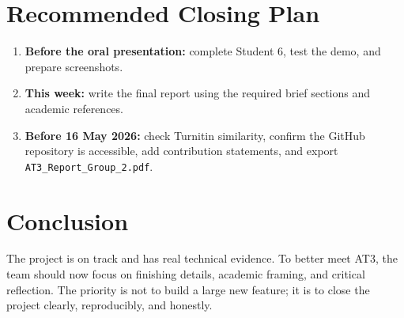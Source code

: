 \documentclass[11pt,a4paper]{article}
\begin{document}
\section{Recommended Closing Plan}
\begin{enumerate}
  \item \textbf{Before the oral presentation:} complete Student 6, test the demo, and prepare screenshots.
  \item \textbf{This week:} write the final report using the required brief sections and academic references.
  \item \textbf{Before 16 May 2026:} check Turnitin similarity, confirm the GitHub repository is accessible, add contribution statements, and export \texttt{AT3\_Report\_Group\_2.pdf}.
\end{enumerate}

\section{Conclusion}
The project is on track and has real technical evidence. To better meet AT3, the team should now focus on finishing details, academic framing, and critical reflection. The priority is not to build a large new feature; it is to close the project clearly, reproducibly, and honestly.
\end{document}
